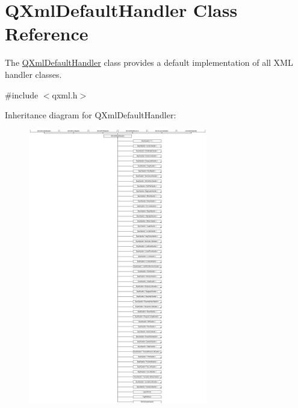 \hypertarget{class_q_xml_default_handler}{}\section{Q\+Xml\+Default\+Handler Class Reference}
\label{class_q_xml_default_handler}


The \mbox{\hyperlink{class_q_xml_default_handler}{Q\+Xml\+Default\+Handler}} class provides a default implementation of all X\+ML handler classes.  




{\ttfamily \#include $<$qxml.\+h$>$}

Inheritance diagram for Q\+Xml\+Default\+Handler\+:\begin{figure}[H]
\begin{center}
\leavevmode
\includegraphics[height=12.000000cm]{class_q_xml_default_handler}
\end{center}
\end{figure}
